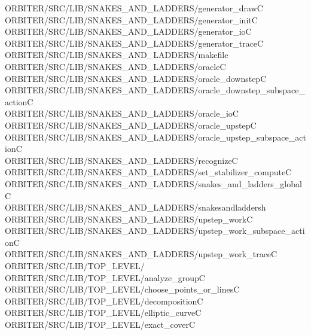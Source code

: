 \begin{tabbing}
ORBITER/SRC/LIB/SNAKES\_AND\_LADDERS/generator\_drawC\\[0pt]
ORBITER/SRC/LIB/SNAKES\_AND\_LADDERS/generator\_initC\\[0pt]
ORBITER/SRC/LIB/SNAKES\_AND\_LADDERS/generator\_ioC\\[0pt]
ORBITER/SRC/LIB/SNAKES\_AND\_LADDERS/generator\_traceC\\[0pt]
ORBITER/SRC/LIB/SNAKES\_AND\_LADDERS/makefile\\[0pt]
ORBITER/SRC/LIB/SNAKES\_AND\_LADDERS/oracleC\\[0pt]
ORBITER/SRC/LIB/SNAKES\_AND\_LADDERS/oracle\_downstepC\\[0pt]
ORBITER/SRC/LIB/SNAKES\_AND\_LADDERS/oracle\_downstep\_subspace\_actionC\\[0pt]
ORBITER/SRC/LIB/SNAKES\_AND\_LADDERS/oracle\_ioC\\[0pt]
ORBITER/SRC/LIB/SNAKES\_AND\_LADDERS/oracle\_upstepC\\[0pt]
ORBITER/SRC/LIB/SNAKES\_AND\_LADDERS/oracle\_upstep\_subspace\_actionC\\[0pt]
ORBITER/SRC/LIB/SNAKES\_AND\_LADDERS/recognizeC\\[0pt]
ORBITER/SRC/LIB/SNAKES\_AND\_LADDERS/set\_stabilizer\_computeC\\[0pt]
ORBITER/SRC/LIB/SNAKES\_AND\_LADDERS/snakes\_and\_ladders\_globalC\\[0pt]
ORBITER/SRC/LIB/SNAKES\_AND\_LADDERS/snakesandladdersh\\[0pt]
ORBITER/SRC/LIB/SNAKES\_AND\_LADDERS/upstep\_workC\\[0pt]
ORBITER/SRC/LIB/SNAKES\_AND\_LADDERS/upstep\_work\_subspace\_actionC\\[0pt]
ORBITER/SRC/LIB/SNAKES\_AND\_LADDERS/upstep\_work\_traceC\\[0pt]
ORBITER/SRC/LIB/TOP\_LEVEL/\\[0pt]
ORBITER/SRC/LIB/TOP\_LEVEL/analyze\_groupC\\[0pt]
ORBITER/SRC/LIB/TOP\_LEVEL/choose\_points\_or\_linesC\\[0pt]
ORBITER/SRC/LIB/TOP\_LEVEL/decompositionC\\[0pt]
ORBITER/SRC/LIB/TOP\_LEVEL/elliptic\_curveC\\[0pt]
ORBITER/SRC/LIB/TOP\_LEVEL/exact\_coverC\\[0pt]

\end{tabbing}
